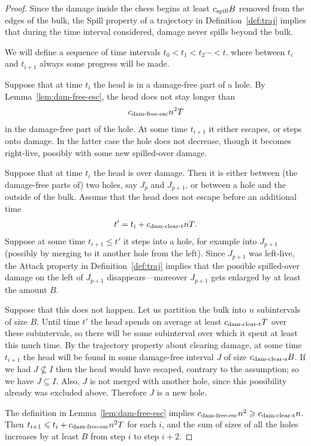 \documentclass[12pt]{memoir}
\def\B{B}
\newcommand{\Tu}{T}
\newcommand{\cns}[1]{c_{\textrm{\upshape #1}}}
\newcommand{\cDamFreeEsc}{\cns{dam-free-esc}}
\newcommand{\cDamClearS}{\cns{dam-clear-s}}
\newcommand{\cDamClearT}{\cns{dam-clear-t}}
\newcommand{\cSpill}{\cns{spill}}
\begin{document}
  \begin{proof}
Since the damage inside the chees begins at least \( \cSpill \B \) removed from the edges 
of the bulk,
the Spill property of a trajectory in Definition~\ref{def:traj} implies
that during the time interval considered, damage never spills beyond the bulk.

We will define a sequence of time intervals \( t_{0}<t_{1}<t_{2}\dotsm<t \),
where between \( t_{i} \) and \( t_{i+1} \) always some progress will be made.

Suppose that at time \( t_{i} \) the head is in a damage-free part of a hole.
By Lemma~\ref{lem:dam-free-esc}, the head does not stay longer than
\begin{align*}
\cDamFreeEsc n^{2}\Tu
 \end{align*}
in the damage-free part of the hole.
At some time \( t_{i+1} \) it either escapes, or steps onto damage. 
In the latter case the hole does not decrease, though it becomes right-live, 
possibly with some new spilled-over damage.

Suppose that at time \( t_{i} \) the head is over damage.
Then it is either between (the damage-free parts of)
two holes, say \( J_{p} \) and \( J_{p+1} \), 
or between a hole and the outside of the bulk.
Assume that the head does not escape before an additional time
\begin{align*}
 t'=t_{i}+\cDamClearT n\Tu.
 \end{align*}
Suppose at some time \( t_{i+1} \le t' \) 
it steps into a hole, for example into \( J_{p+1} \) (possibly by merging to it
another hole from the left).
Since \( J_{p+1} \) was left-live, the Attack property in 
Definition~\ref{def:traj} implies that the possible spilled-over damage 
on the left of \( J_{p+1} \) disappears---moreover \( J_{p+1} \)
gets enlarged by at least the amount \( \B \).

Suppose that this does not happen.
Let us partition the bulk into \( n \) subintervals of size \( \B \).
Until time \( t' \) the head spends on average at least
\( \cDamClearT \Tu \) over these subintervals,  so 
there will be some subinterval over which it spent 
at least this much time.
By the trajectory property about clearing damage, 
at some time \( t_{i+1} \) the head will be found in some damage-free
interval \( J \) of size \( \cDamClearS \B \).
If we had \( J\not\subseteq I \) then the head would have escaped, 
contrary to the assumption; so we have \( J\subseteq I \).
Also, \( J \) is not merged with another hole, since this
possibility already was excluded above.
Therefore \( J \) is a new hole.

\begin{sloppypar}
The definition in Lemma~\ref{lem:dam-free-esc} implies
\( \cDamFreeEsc n^{2} \ge \cDamClearT n \).
Then \( t_{i+1}\le t_{i}+\cDamFreeEsc n^{2}\Tu \) 
for each \( i \), and the sum of sizes of all the holes
increases by at least \( \B \) from step \( i \) to step \( i+2 \).
  \end{sloppypar}
 \end{proof}
\end{document}
